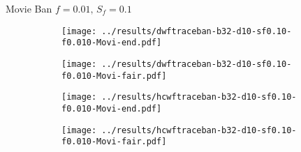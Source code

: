 \documentclass[8pt,a4paper]{beamer}
\begin{document}
\begin{frame}{Movie Ban $f=0.01,\, S_f=0.1$}
	\begin{figure}
		\begin{subfigure}{.48\textwidth}
			\centering
			\texttt{[image: ../results/dwftraceban-b32-d10-sf0.10-f0.010-Movi-end.pdf]}
		\end{subfigure}
		\begin{subfigure}{.48\textwidth}
			\centering
			\texttt{[image: ../results/dwftraceban-b32-d10-sf0.10-f0.010-Movi-fair.pdf]}
		\end{subfigure}
	\end{figure}

	\begin{figure}
		\begin{subfigure}{.48\textwidth}
			\centering
			\texttt{[image: ../results/hcwftraceban-b32-d10-sf0.10-f0.010-Movi-end.pdf]}
		\end{subfigure}
		\begin{subfigure}{.48\textwidth}
			\centering
			\texttt{[image: ../results/hcwftraceban-b32-d10-sf0.10-f0.010-Movi-fair.pdf]}
		\end{subfigure}
	\end{figure}
\end{frame}

%
%
\end{document}
